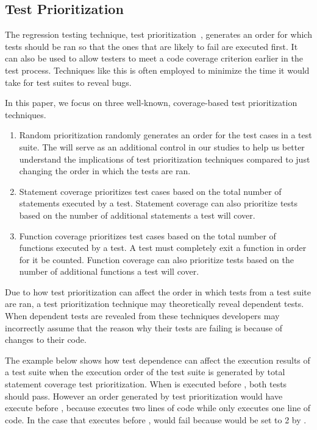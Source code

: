 \subsection{Test Prioritization}
The regression testing technique, test prioritization~\cite{}, generates an order for which tests should be ran so that the ones that are likely to fail are executed first. It can also be used to allow testers to meet a code coverage criterion earlier in the test process. Techniques like this is often employed to minimize the time it would take for test suites to reveal bugs. 

In this paper, we focus on three well-known, coverage-based test prioritization techniques.

\begin{enumerate}
\item Random prioritization randomly generates an order for the test cases in a test suite. The will serve as an additional control in our studies to help us better understand the implications of test prioritization techniques compared to just changing the order in which the tests are ran.

\item Statement coverage prioritizes test cases based on the total number of statements executed by a test. Statement coverage can also prioritize tests based on the number of additional statements a test will cover.

\item Function coverage prioritizes test cases based on the total number of functions executed by a test. A test must completely exit a function in order for it be counted. Function coverage can also prioritize tests based on the number of additional functions a test will cover.

\end{enumerate}

Due to how test prioritization can affect the order in which tests from a test suite are ran, a test prioritization technique may theoretically reveal dependent tests. When dependent tests are revealed from these techniques developers may incorrectly assume that the reason why their tests are failing is because of changes to their code.

The example below shows how test dependence can affect the execution results of a test suite when the execution order of the test suite is generated by total statement coverage test prioritization. When  is executed before , both tests should pass. However an order generated by test prioritization would have  execute before , because  executes two lines of code while  only executes one line of code. In the case that  executes before ,  would fail because  would be set to 2 by . 

